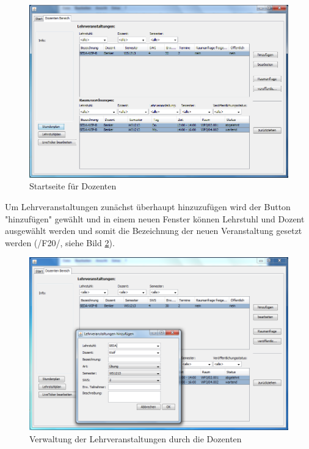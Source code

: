 \begin{figure}[H]
\begin{center}
\includegraphics[width=150mm]{images/section_7/DozentenHauptseite.PNG}
\caption{Startseite für Dozenten}
\label{img:StartDoz}
\end{center}
\end{figure}

Um Lehrveranstaltungen zunächst überhaupt hinzuzufügen wird der Button "hinzufügen" gewählt und in einem neuen Fenster können Lehrstuhl und Dozent ausgewählt werden und somit die Bezeichnung der neuen Veranstaltung gesetzt werden (/F20/, siehe Bild \ref{img:LehrveranstaltungsVerwDoz}). 

\begin{figure}[H]
\begin{center}
\includegraphics[width=150mm]{images/section_7/DozentenLehrveranstaltungenHinzufuegen.PNG}
\caption{Verwaltung der Lehrveranstaltungen durch die Dozenten}
\label{img:LehrveranstaltungsVerwDoz}
\end{center}
\end{figure}


